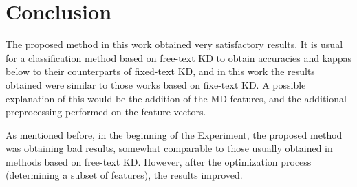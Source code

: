 \documentclass[runningheads,a4paper]{llncs}
\begin{document}
\section{Conclusion}

The proposed method in this work obtained very satisfactory results. It is usual for a classification method based on free-text KD to obtain accuracies and kappas below to their counterparts of fixed-text KD, and in this work the results obtained were similar to those works based on fixe-text KD. A possible explanation of this would be the addition of the MD features, and the additional preprocessing performed on the feature vectors.

As mentioned before, in the beginning of the Experiment, the proposed method was obtaining bad results, somewhat comparable to those usually obtained in methods based on free-text KD. However, after the optimization process (determining a subset of features), the results improved.
\end{document}
